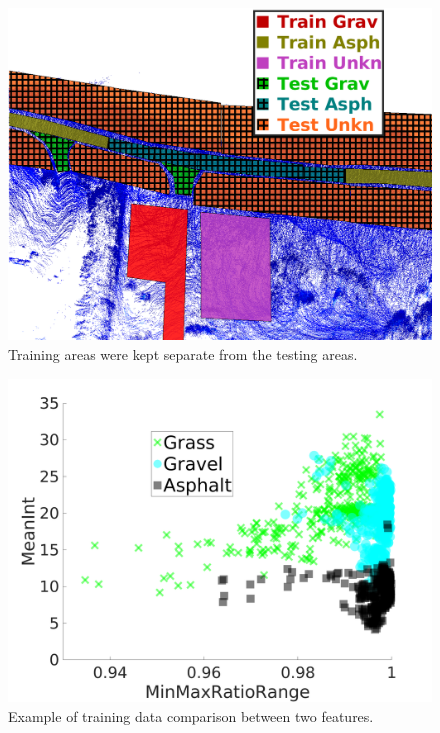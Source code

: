 \documentclass[journal,onecolumn]{IEEEtran}
\begin{document}
			\begin{figure}[H]
				\centering
				\includegraphics[width=0.75\linewidth]{figures/test_vs_train_areas_hatch}
				\caption[Training vs Testing Areas]{Training areas were kept separate from the testing areas.}
				\label{fig:test_vs_train_areas}
			\end{figure}
			

			\begin{figure}[H]
			\centering
			\includegraphics[width=0.75\linewidth]{figures/training_data_cluster_3}
			\caption[Example Clustering]{Example of training data comparison between two features.}
			\label{fig:training_data_cluster_2}
			\end{figure}
	
\end{document}
